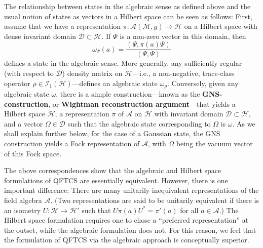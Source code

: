 \documentclass[12pt]{article}
\newcommand{\eA}{\mathscr{A}}
\newcommand{\eD}{\mathscr{D}}
\newcommand{\eH}{\mathscr{H}}
\newcommand{\M}{\mathscr{M}}
\theoremstyle{plain}
\theoremstyle{definition}
\def\ben{\begin{equation}}
\def\een{\end{equation}}
\begin{document}
The relationship between states in the algebraic sense as defined above and the usual notion of states as
vectors in a Hilbert space can be seen as follows:
First, assume that we have a representation $\pi: \eA(\M,g) \to \eH$ on a Hilbert space
with dense invariant domain $\eD \subset \eH$. If $\Psi$ is a non-zero vector in this domain,
then
\ben
\omega_\Psi(a) = \frac{(\Psi, \pi(a) \Psi)}{(\Psi,\Psi)}
\een
defines a state in the algebraic sense. More generally, any
sufficiently regular (with respect to $\eD$) density matrix on $\eH$---i.e., a non-negative, trace-class operator
$\rho \in {\mathscr I}_1(\eH)$---defines
an algebraic state $\omega_\rho$. Conversely, given any algebraic state $\omega$, there is a simple
construction---known as the {\bf GNS-construction}, or {\bf Wightman reconstruction argument}---that yields a Hilbert space $\eH$, a representation $\pi$ of $\eA$ on $\eH$ with invariant
domain $\eD \subset \eH$, and a vector $\Omega \in \eD$ such that the
algebraic state corresponding to $\Omega$ is $\omega$. As we shall explain further below, for the case of a Gaussian state, the GNS construction yields a Fock representation of $\eA$, with $\Omega$ being the vacuum vector of this Fock space.

The above correspondences show that the algebraic and Hilbert space formulations
of QFTCS are essentially equivalent. However, there is one important difference: There are many
unitarily inequivalent representations of the field algebra $\eA$. (Two representations are said to be unitarily
equivalent if there is an isometry $U: \eH \to \eH'$ such that $U \pi(a) U^* = \pi'(a)$ for
all $a \in \eA$.) The Hilbert space formulation requires one to
chose a ``preferred representation'' at the outset, while the algebraic formulation does not. For this reason, we feel that the formulation of QFTCS via the algebraic approach is conceptually superior.
\end{document}
